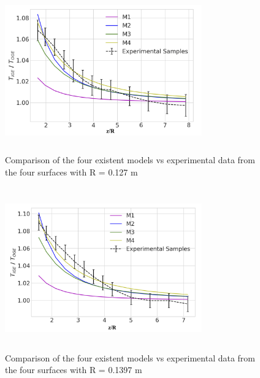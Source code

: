\documentclass[twocolumn,10pt]{asme2ej}
\begin{document}
\begin{figure}[t]
    \begin{center}
        \setlength{\unitlength}{0.012500in}%
        \includegraphics[width=8.5cm, height=7cm]{Images/r2sx.png}
    \end{center}
  \caption{Comparison of the four existent models vs experimental data from the four surfaces with R = 0.127 m}
  \label{r2sx_plot}
\end{figure}

\begin{figure}[t]
    \begin{center}
        \setlength{\unitlength}{0.012500in}%
        \includegraphics[width=8.5cm, height=7cm]{Images/r3sx.png}
    \end{center}
  \caption{Comparison of the four existent models vs experimental data from the four surfaces with R = 0.1397 m}
  \label{r3sx_plot}
\end{figure}
\end{document}
